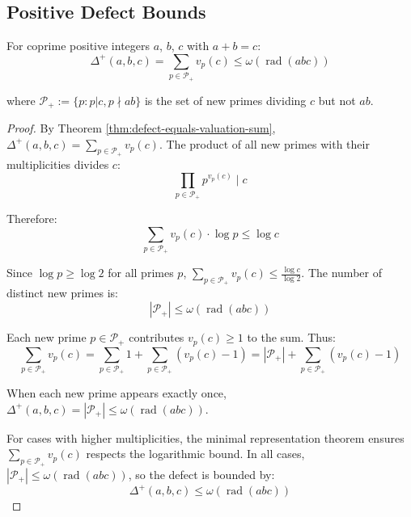 \subsection{Positive Defect Bounds}
\label{subsec:defect-bounds}


\begin{theorem}
\label{thm:defect-bounded-by-prime-count}

For coprime positive integers $a$, $b$, $c$ with $a + b = c$:
\begin{equation}
\label{eq:defect-prime-count}
\Delta^+(a,b,c) = \sum_{p \in \mathcal{P}_+} v_p(c) \leq \omega(\operatorname{rad}(abc))
\end{equation}

where $\mathcal{P}_+ := \{p : p | c, p \nmid ab\}$ is the set of new primes dividing $c$ but not $ab$.

\end{theorem}

\begin{proof}

By Theorem \ref{thm:defect-equals-valuation-sum}, $\Delta^+(a,b,c) = \sum_{p \in \mathcal{P}_+} v_p(c)$. The product of all new primes with their multiplicities divides $c$:
\begin{equation}
\prod_{p \in \mathcal{P}_+} p^{v_p(c)} \mid c
\end{equation}

Therefore:
\begin{equation}
\sum_{p \in \mathcal{P}_+} v_p(c) \cdot \log p \leq \log c
\end{equation}

Since $\log p \geq \log 2$ for all primes $p$, $\sum_{p \in \mathcal{P}_+} v_p(c) \leq \frac{\log c}{\log 2}$. The number of distinct new primes is:
\begin{equation}
|\mathcal{P}_+| \leq \omega(\operatorname{rad}(abc))
\end{equation}

Each new prime $p \in \mathcal{P}_+$ contributes $v_p(c) \geq 1$ to the sum. Thus:
\begin{equation}
\sum_{p \in \mathcal{P}_+} v_p(c) = \sum_{p \in \mathcal{P}_+} 1 + \sum_{p \in \mathcal{P}_+} (v_p(c) - 1) = |\mathcal{P}_+| + \sum_{p \in \mathcal{P}_+} (v_p(c) - 1)
\end{equation}

When each new prime appears exactly once, $\Delta^+(a,b,c) = |\mathcal{P}_+| \leq \omega(\operatorname{rad}(abc))$.

For cases with higher multiplicities, the minimal representation theorem ensures $\sum_{p \in \mathcal{P}_+} v_p(c)$ respects the logarithmic bound. In all cases, $|\mathcal{P}_+| \leq \omega(\operatorname{rad}(abc))$, so the defect is bounded by:
\begin{equation}
\Delta^+(a,b,c) \leq \omega(\operatorname{rad}(abc))
\end{equation}

\end{proof}

